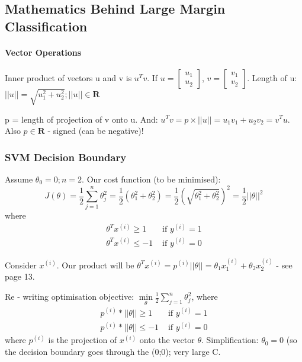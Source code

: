 \documentclass{scrartcl}
\begin{document}
\subsection{Mathematics Behind Large Margin Classification}
\label{sec:12-3}

\paragraph{Vector Operations}
Inner product of vectors u and v is $u^Tv$. If $u =
\left[ \begin{array}{c} u_1 \\ u_2 \end{array} \right] $, $v =
\left[ \begin{array}{c} v_1 \\ v_2 \end{array} \right] $. Length of u:
$||u|| = \sqrt{u_1^2 + u_2^2}; ||u|| \in \mathbf{R}$

p = length of projection of v onto u. And: $u^Tv = p \times ||u|| =
u_1 v_1 + u_2 v_2 = v^Tu$. Also $p \in \mathbf{R}$ - signed (can be
negative)!

\subsubsection{SVM Decision Boundary}
\label{sec:12-3-1}
Assume $\theta_0 = 0; n = 2$. Our cost function (to be minimised):
\[J(\theta) = \frac{1}{2} \sum \limits_{j=1}^{n}\theta_j^2 =
\frac{1}{2}(\theta_1^2 + \theta_2^2) = \frac{1}{2}(\sqrt{\theta_1^2 +
  \theta_2^2})^2 = \frac{1}{2}||\theta||^2\]
where \[ \begin{array}{ll}
  \theta^Tx^{(i)} \geq 1 & \textrm{ if } y^{(i)} = 1 \\
  \theta^Tx^{(i)} \leq -1 & \textrm{ if } y^{(i)} = 0
\end{array} \]

Consider $x^{(i)}$. Our product will be $\theta^Tx^{(i)} = p^{(i)}
||\theta|| = \theta_1 x_1^{(i)} + \theta_2 x_2^{(i)}$ - see page 13.

Re - writing optimisation objective: $ \min \limits_{\theta}
\frac{1}{2}\sum \limits_{j=1}^{n} \theta_j^2$,
where \[\begin{array}{ll}
  p^{(i)} * ||\theta|| \geq 1 & \textrm{ if } y^{(i)} = 1 \\
  p^{(i)} * ||\theta|| \leq -1 & \textrm{ if } y^{(i)} = 0
\end{array}\]
where $p^{(i)}$ is the projection of $x^{(i)}$ onto the vector
$\theta$. Simplification: $\theta_0 = 0$ (so the decision boundary
goes through the (0;0); very large C.
\end{document}
